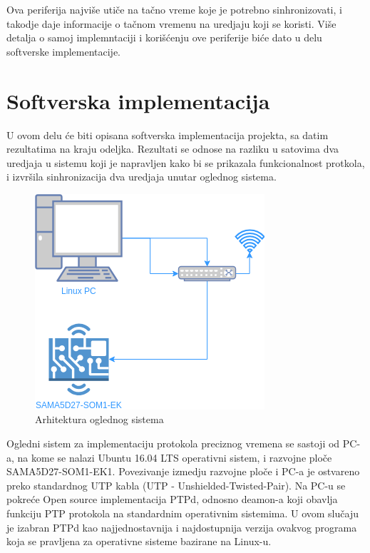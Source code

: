 \documentclass[a4paper,12pt, master]{etf}
\begin{document}
    Ova periferija najvi\v{s}e uti\v{c}e na ta\v{c}no vreme koje je potrebno
    sinhronizovati, i takodje daje informacije o ta\v{c}nom vremenu na uredjaju
    koji se koristi. Vi\v{s}e detalja o samoj implemntaciji i kori\v{s}\'{c}enju
    ove periferije bi\'{c}e dato u delu softverske implementacije.

	\newpage

	\chapter{Softverska implementacija}

    U ovom delu \'{c}e biti opisana softverska implementacija projekta, sa
	datim rezultatima na kraju odeljka. Rezultati se odnose na razliku u
	satovima dva uredjaja u sistemu koji je napravljen kako bi se prikazala
	funkcionalnost protkola, i izvr\v{s}ila sinhronizacija dva uredjaja unutar
	oglednog sistema.

	\begin{figure}[htb]
			\centering
			\includegraphics[scale=.5]{../pic/arch.png}
			\caption{Arhitektura oglednog sistema}
			\label{fig:arch_system}
	\end{figure}

    Ogledni sistem za implementaciju protokola preciznog vremena se sastoji
	od PC-a, na kome se nalazi Ubuntu 16.04 LTS operativni sistem, i razvojne
	plo\v{c}e SAMA5D27-SOM1-EK1. Povezivanje izmedju razvojne plo\v{c}e i PC-a
	je ostvareno preko standardnog UTP kabla (UTP - Unshielded-Twisted-Pair).
	Na PC-u se pokre\'{c}e Open source implementacija PTPd, odnosno deamon-a
	koji obavlja funkciju PTP protokola na standardnim operativnim sistemima. U
	ovom slu\v{c}aju je izabran PTPd kao najjednostavnija i najdostupnija
	verzija ovakvog programa koja se pravljena za operativne sisteme bazirane
	na Linux-u.
\end{document}
